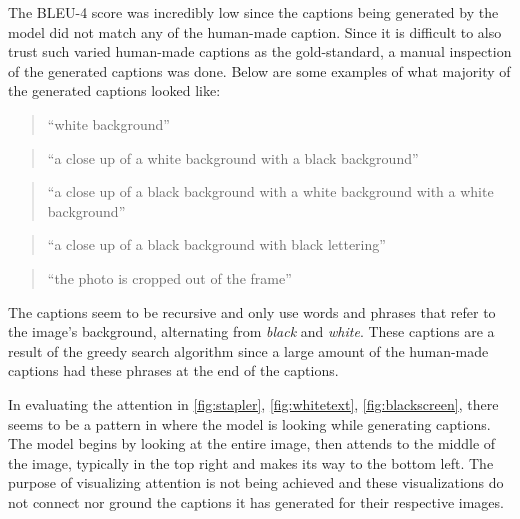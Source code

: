 \documentclass[11pt,a4paper]{article}
\begin{document}
The BLEU-4 score was incredibly low since the captions being generated by the model did not match any of the human-made caption. Since it is difficult to also trust such varied human-made captions as the gold-standard, a manual inspection of the generated captions was done. Below are some examples of what majority of the generated captions looked like:
\begin{quote}
  ``white background''
\end{quote}
\begin{quote}
  ``a close up of a white background with a black background''
\end{quote}
\begin{quote}
  ``a close up of a black background with a white background with a white background''
\end{quote}
\begin{quote}
  ``a close up of a black background with black lettering''
\end{quote}
\begin{quote}
  ``the photo is cropped out of the frame''
\end{quote}

The captions seem to be recursive and only use words and phrases that refer to the image’s background, alternating from \emph{black} and \emph{white}. These captions are a result of the greedy search algorithm since a large amount of the human-made captions had these phrases at the end of the captions.
	
In evaluating the attention in \autoref{fig:stapler}, \autoref{fig:whitetext}, \autoref{fig:blackscreen}, there seems to be a pattern in where the model is looking while generating captions. The model begins by looking at the entire image, then attends to the middle of the image, typically in the top right and makes its way to the bottom left. The purpose of visualizing attention is not being achieved and these visualizations do not connect nor ground the captions it has generated for their respective images. 
\end{document}
